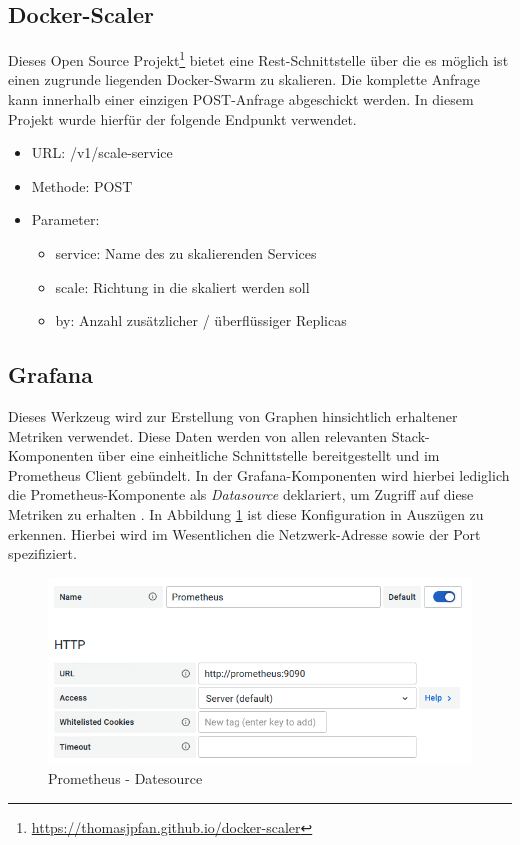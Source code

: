 \subsection{Docker-Scaler}
Dieses Open Source Projekt\footnote{\url{https://thomasjpfan.github.io/docker-scaler}} bietet eine Rest-Schnittstelle über die es möglich ist einen zugrunde liegenden Docker-Swarm zu skalieren. Die komplette Anfrage kann innerhalb einer einzigen POST-Anfrage abgeschickt werden. In diesem Projekt wurde hierfür der folgende Endpunkt verwendet.

\begin{itemize}
  \item URL: /v1/scale-service
  \item Methode: POST
  \item Parameter:
  \begin{itemize}
    \item service: Name des zu skalierenden Services
    \item scale: Richtung in die skaliert werden soll 
    \item by: Anzahl zusätzlicher / überflüssiger Replicas
  \end{itemize}
\end{itemize}

\subsection{Grafana}

Dieses Werkzeug wird zur Erstellung von Graphen hinsichtlich erhaltener Metriken verwendet. Diese Daten werden von allen relevanten Stack-Komponenten über eine einheitliche Schnittstelle bereitgestellt und im Prometheus Client gebündelt. In der Grafana-Komponenten wird hierbei lediglich die Prometheus-Komponente als \emph{Datasource} deklariert, um Zugriff auf diese Metriken zu erhalten \cite[Seite~99 ff.]{oreillyPrometheus}. In Abbildung \ref{fig:prometheusDatasource}  ist diese Konfiguration in Auszügen zu erkennen. Hierbei wird im Wesentlichen die Netzwerk-Adresse sowie der Port spezifiziert. 

\begin{figure}[ht!]
	\centering
	\includegraphics[width=.9\linewidth]{kapitel/problemloesung/implementierung/_img/prometheus-datasource}
	\caption[Prometheus - Datesource]{Prometheus - Datesource}
	\label{fig:prometheusDatasource}
\end{figure}

